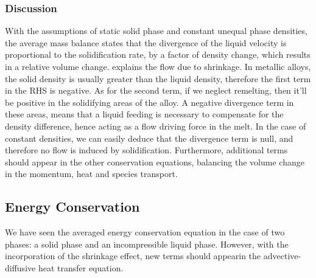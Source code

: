 \subsubsection{Discussion}
With the assumptions of static solid phase and constant unequal phase densities, the average mass balance states that 
the divergence of the liquid velocity is proportional to the solidification rate, by a factor of density change, 
which results in a relative volume change.  explains the flow due to shrinkage. In metallic alloys, the solid density is
usually greater than the liquid density, therefore the first term in the RHS is negative. As for the second term, if we
neglect remelting, then it'll be positive in the solidifying areas of the alloy. A negative divergence term in these areas, 
means that a liquid feeding is necessary to compensate for the density difference, hence acting as a flow driving force in the melt.
In the case of constant densities, we can easily deduce that the divergence term is null, and therefore no flow is induced
by solidification. Furthermore, additional terms should appear in the other conservation equations, balancing the volume 
change in the momentum, heat and species transport.

\subsection{Energy Conservation}
We have seen the averaged energy conservation equation in the case of two phases: 
a solid phase and an incompressible liquid phase. However, with the incorporation of
the shrinkage effect, new terms should appearin the advective-diffusive heat transfer equation. 
